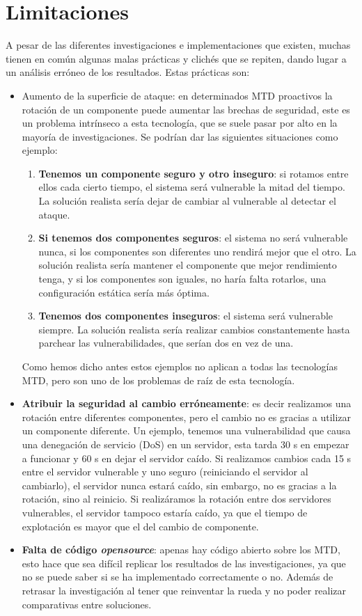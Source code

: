 \section{Limitaciones}\label{limitaciones}
A pesar de las diferentes investigaciones e implementaciones que existen, muchas tienen en común algunas malas prácticas y clichés que se repiten, dando lugar a un análisis erróneo de los resultados. Estas prácticas son:
\begin{itemize}
    \item \label{limit:superficie}Aumento de la superficie de ataque: en determinados MTD proactivos la rotación de un componente puede aumentar las brechas de seguridad\cite{MTD-critica}, este es un problema intrínseco a esta tecnología, que se suele pasar por alto en la mayoría de investigaciones. Se podrían dar las siguientes situaciones como ejemplo:
    \begin{enumerate}
        \item \textbf{Tenemos un componente seguro y otro inseguro}: si rotamos entre ellos cada cierto tiempo, el sistema será vulnerable la mitad del tiempo. La solución realista sería dejar de cambiar al vulnerable al detectar el ataque.
        \item \textbf{Si tenemos dos componentes seguros}: el sistema no será vulnerable nunca, si los componentes son diferentes uno rendirá mejor que el otro. La solución realista sería mantener el componente que mejor rendimiento tenga, y si los componentes son iguales, no haría falta rotarlos, una configuración estática sería más óptima.
        \item \textbf{Tenemos dos componentes inseguros}: el sistema será vulnerable siempre. La solución realista sería realizar cambios constantemente hasta parchear las vulnerabilidades, que serían dos en vez de una.
    \end{enumerate}
    Como hemos dicho antes estos ejemplos no aplican a todas las tecnologías MTD, pero son uno de los problemas de raíz de esta tecnología.
    \item \label{limit:wrong_security}\textbf{Atribuir la seguridad al cambio erróneamente}: es decir realizamos una rotación entre diferentes componentes, pero el cambio no es gracias a utilizar un componente diferente. Un ejemplo, tenemos una vulnerabilidad que causa una denegación de servicio (DoS) en un servidor, esta tarda 30 s en empezar a funcionar y 60 s en dejar el servidor caído. Si realizamos cambios cada 15 s entre el servidor vulnerable y uno seguro (reiniciando el servidor al cambiarlo), el servidor nunca estará caído, sin embargo, no es gracias a la rotación, sino al reinicio. Si realizáramos la rotación entre dos servidores vulnerables, el servidor tampoco estaría caído, ya que el tiempo de explotación es mayor que el del cambio de componente.
    \item \label{limit:opensource}\textbf{Falta de código \textit{opensource}}: apenas hay código abierto sobre los MTD, esto hace que sea difícil replicar los resultados de las investigaciones, ya que no se puede saber si se ha implementado correctamente o no. Además de retrasar la investigación al tener que reinventar la rueda y no poder realizar comparativas entre soluciones.
\end{itemize}

